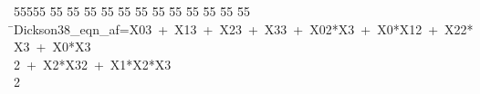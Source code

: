 %
%
\begin{tabbing}
55555 \= 55 \= 55 \= 55 \= 55 \= 55 \= 55 \= 55 \= 55 \= 55 \= 55 \= 55 \= 55 \= \>Dickson38\_eqn\_af=X03\ +\ X13\ +\ X23\ +\ X33\ +\ X02*X3\ +\ X0*X12\ +\ X22*X3\ +\ X0*X3\\[0pt]
\>2\ +\ X2*X32\ +\ X1*X2*X3\\[0pt]
2\>\end{tabbing}
